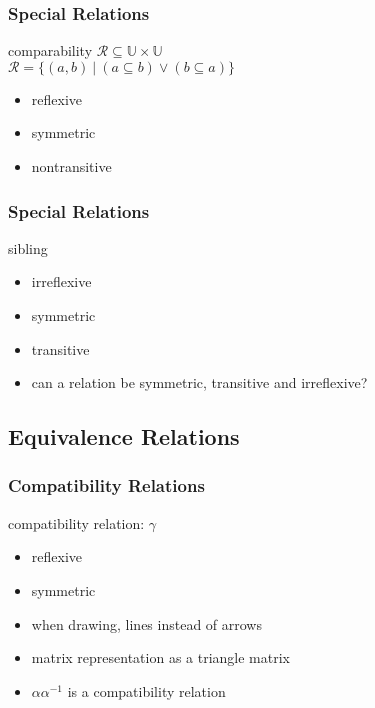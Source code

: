\documentclass[dvipsnames]{beamer}
\begin{document}
\begin{frame}
  \frametitle{Special Relations}

  \begin{block}{comparability}
    $\mathcal{R} \subseteq \mathbb{U} \times \mathbb{U}$\\
    $\mathcal{R} = \{(a,b)~|~(a \subseteq b) \vee (b \subseteq a)\}$

    \medskip
    \begin{itemize}
      \item reflexive
      \item symmetric
      \item nontransitive
    \end{itemize}
  \end{block}
\end{frame}

\begin{frame}
  \frametitle{Special Relations}

  \begin{block}{sibling}
    \begin{itemize}
      \item irreflexive
      \item symmetric
      \item transitive
    \end{itemize}

    \pause
    \medskip
    \begin{itemize}
      \item can a relation be symmetric, transitive and irreflexive?
    \end{itemize}
  \end{block}
\end{frame}

\subsection{Equivalence Relations}

\begin{frame}
  \frametitle{Compatibility Relations}

  \begin{definition}
    \alert{compatibility relation}: $\gamma$
    \begin{itemize}
      \item reflexive
      \item symmetric
    \end{itemize}
  \end{definition}

  \pause
  \begin{itemize}
    \item when drawing, lines instead of arrows
    \item matrix representation as a triangle matrix
  \end{itemize}

  \pause
  \begin{itemize}
    \item $\alpha \alpha^{-1}$ is a compatibility relation
  \end{itemize}
\end{frame}
\end{document}
